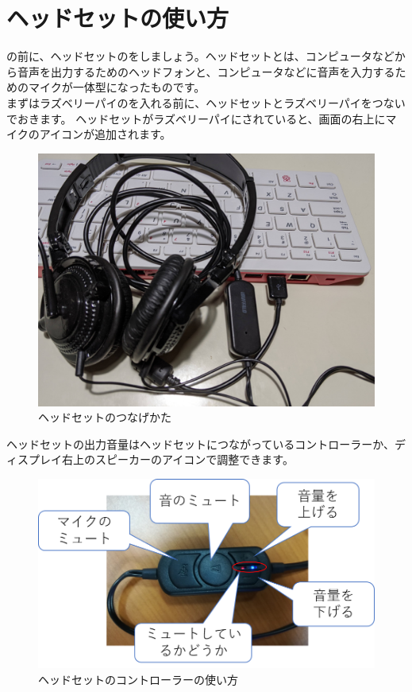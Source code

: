 \newpage
\section{ヘッドセットの使い方}
の前に、ヘッドセットのをしましょう。ヘッドセットとは、コンピュータなどから音声を出力するためのヘッドフォンと、コンピュータなどに音声を入力するためのマイクが一体型になったものです。\\
まずはラズベリーパイのを入れる前に、ヘッドセットとラズベリーパイをつないでおきます。
ヘッドセットがラズベリーパイにされていると、画面の右上にマイクのアイコンが追加されます。

\begin{figure}[H]
\begin{center}
    \includegraphics[width=.6\linewidth]{images/how_to_connect_headset.jpg}
    \caption{ヘッドセットのつなげかた}
    \label{つなげかた}
\end{center}
\end{figure}

ヘッドセットの出力音量はヘッドセットにつながっているコントローラーか、ディスプレイ右上のスピーカーのアイコンで調整できます。

\begin{figure}[H]
\begin{center}
    \includegraphics[width=.6\linewidth]{images/chap06/text06-img004.png}
    \caption{ヘッドセットのコントローラーの使い方}
    \label{ヘッドセットのコントローラーの使い方}
\end{center}
\end{figure}

